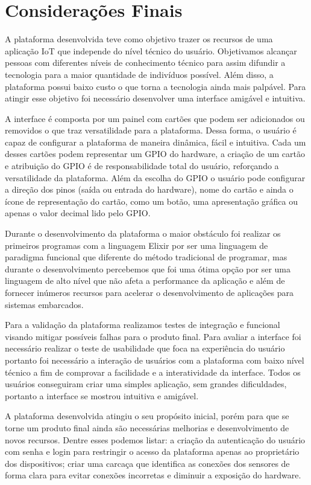 \documentclass[../../layout.tex]{subfiles}
\begin{document}
\chapter{Considerações Finais}
\hspace*{3em}A plataforma desenvolvida teve como objetivo trazer os recursos de uma aplicação IoT que independe do nível técnico do usuário. Objetivamos alcançar pessoas com diferentes níveis de conhecimento técnico para assim difundir a tecnologia para a maior quantidade de indivíduos possível. Além disso, a plataforma possui baixo custo o que torna a tecnologia ainda mais palpável. Para atingir esse objetivo foi necessário desenvolver uma interface amigável e intuitiva.\par
A interface é composta por um painel com cartões que podem ser adicionados ou removidos o que traz versatilidade para a plataforma. Dessa forma, o usuário é capaz de configurar a plataforma de maneira dinâmica, fácil e intuitiva. Cada um desses cartões podem representar um GPIO do hardware, a criação de um cartão e atribuição do GPIO é de responsabilidade total do usuário, reforçando a versatilidade da plataforma. Além da escolha do GPIO o usuário pode configurar a direção dos pinos (saída ou entrada do hardware), nome do cartão e ainda o ícone de representação do cartão, como um botão, uma apresentação gráfica ou apenas o valor decimal lido pelo GPIO.\par
Durante o desenvolvimento da plataforma o maior obstáculo foi  realizar os primeiros programas com a linguagem Elixir por ser uma linguagem de paradigma funcional que diferente do método tradicional de programar, mas durante o desenvolvimento percebemos que foi uma ótima opção por ser uma linguagem de alto nível que não afeta a performance da aplicação e além de fornecer inúmeros recursos para acelerar o desenvolvimento de aplicações para sistemas embarcados.\par
Para a validação da plataforma realizamos testes de integração e funcional visando mitigar possíveis falhas para o produto final. Para avaliar a interface foi necessário realizar o teste de usabilidade que foca na experiência do usuário  portanto foi necessário a interação de usuários com a plataforma com baixo nível técnico a fim de comprovar a facilidade e a interatividade da interface. Todos os usuários conseguiram criar uma simples aplicação, sem grandes dificuldades, portanto a interface se mostrou  intuitiva e amigável.\par
A plataforma desenvolvida atingiu o seu propósito inicial, porém para que se torne um produto final ainda são necessárias melhorias e desenvolvimento de novos recursos. Dentre esses podemos listar: a criação da autenticação do usuário com senha e login para restringir o acesso da plataforma apenas ao proprietário dos dispositivos; criar uma carcaça que identifica as conexões dos sensores de forma clara para evitar conexões incorretas e diminuir a exposição do hardware.\par 
\end{document}
